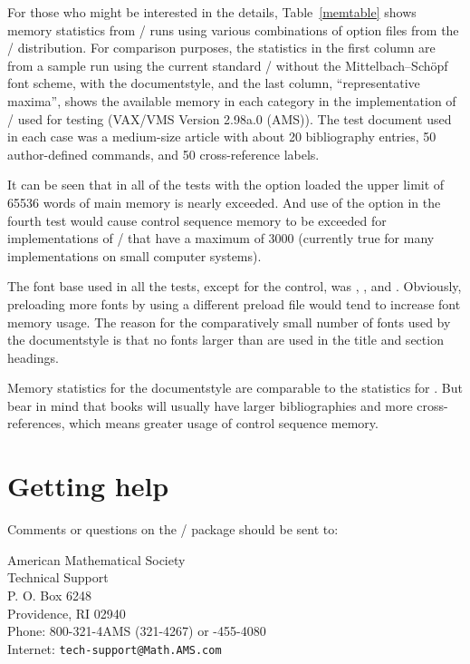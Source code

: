 For those who might be interested in the details, Table~\ref{memtable}
shows memory statistics
from \latex/ runs using various combinations of option files
from the \amslatex/ distribution.  For comparison purposes,
the statistics in the first column are from
a sample run using the current standard \latex/ without
the Mittelbach--Sch\"opf font scheme, with the
 documentstyle, and the last column, ``representative
maxima'', shows the available memory in each category in the
implementation of \tex/ used for testing (VAX/VMS Version 2.98a.0 (AMS)).
The test document used in each case
was a medium-size article with about 20 bibliography
entries, 50 author-defined commands, and 50 cross-reference
labels.

It can be seen that in all of the tests with the  option
loaded the upper limit of 65536 words of main memory is nearly
exceeded.  And use of the  option in the fourth test
would cause control sequence memory to be exceeded for implementations
of \tex/ that have a maximum of 3000 (currently true for
many implementations on small computer systems).

The font base used in all the tests, except for the control, was
, , and .  Obviously,
preloading more fonts by using a different preload file would
tend to increase font memory usage.  The reason for the comparatively
small number of fonts used by the  documentstyle is that
no fonts larger than  are used in the title and
section headings.

Memory statistics for the  documentstyle are comparable
to the statistics for .  But bear in mind that books
will usually have larger bibliographies and more cross-references,
which means greater usage of control sequence memory.

\newpage
\section{Getting help}

Comments or questions on the \amslatex/ package should be sent to:
\medskip

\begin{raggedright}

\leftskip=4.25pc
American Mathematical Society\\
Technical Support\\
P. O. Box 6248\\
Providence, RI 02940\\[3pt]
Phone: 800-321-4AMS (321-4267) \quad or -455-4080\\
Internet: {\tt tech-support@Math.AMS.com}\\
\end{raggedright}
\medskip

